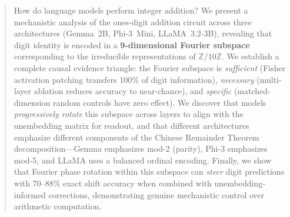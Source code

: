 \begin{abstract}
How do language models perform integer addition? We present a mechanistic analysis of the ones-digit addition circuit across three architectures (Gemma~2B, Phi-3~Mini, LLaMA~3.2-3B), revealing that digit identity is encoded in a \textbf{9-dimensional Fourier subspace} corresponding to the irreducible representations of $\mathbb{Z}/10\mathbb{Z}$. We establish a complete causal evidence triangle: the Fourier subspace is \emph{sufficient} (Fisher activation patching transfers 100\% of digit information), \emph{necessary} (multi-layer ablation reduces accuracy to near-chance), and \emph{specific} (matched-dimension random controls have zero effect). We discover that models \emph{progressively rotate} this subspace across layers to align with the unembedding matrix for readout, and that different architectures emphasize different components of the Chinese Remainder Theorem decomposition---Gemma emphasizes mod-2 (parity), Phi-3 emphasizes mod-5, and LLaMA uses a balanced ordinal encoding. Finally, we show that Fourier phase rotation within this subspace can \emph{steer} digit predictions with 70--88\% exact shift accuracy when combined with unembedding-informed corrections, demonstrating genuine mechanistic control over arithmetic computation.
\end{abstract}
